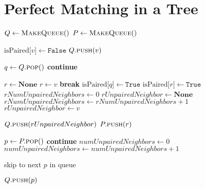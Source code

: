 \documentclass{article}
\begin{document}
\newpage
\section{Perfect Matching in a Tree}
\begin{algorithmic}
        \State $Q \gets \Call{MakeQueue}{\null}$ 
        \State $P \gets \Call{MakeQueue}{\null}$ 

            \State $\text{isPaired[\(v\)]} \gets \texttt{False}$
                \State $Q.\Call{push}{v}$
            \EndIf
        \EndFor

                \State $q \gets Q.\Call{pop}{\null}$
                    \State \textbf{continue}
                \EndIf

                \State $r \gets \textbf{None}$
                 
                        \State $r \gets v$
                        \State \textbf{break}
                    \EndIf
                \EndFor
                \EndIf
                \State $\text{isPaired[\(q\)]} \gets \texttt{True}$
                \State $\text{isPaired[\(r\)]} \gets \texttt{True}$
                \State $rNumUnpairedNeighbors \gets 0$
                \State $rUnpairedNeighbor \gets \textbf{None}$
                    \State $rNumUnpairedNeighbors \gets rNumUnpairedNeighbors + 1$
                    \State $rUnpairedNeighbor \gets v$
                \EndFor

                    \State $Q.\Call{push}{rUnpairedNeighbor}$
                \Else
                    \State $P.\Call{push}{r}$
                \EndIf
            \EndWhile

                \State $p \gets P.\Call{pop}{\null}$
                    \State \textbf{continue}
                \EndIf
                \State $numUnpairedNeighbors \gets 0$ 
                        \State $numUnpairedNeighbors \gets numUnpairedNeighbors + 1$
                    \EndIf

                        \State skip to next $p$ in queue
                    \EndIf
                \EndFor

                \State $Q.\Call{push}{p}$ 
            \EndWhile
        \EndWhile

    \EndFunction
\end{algorithmic}
\end{document}
